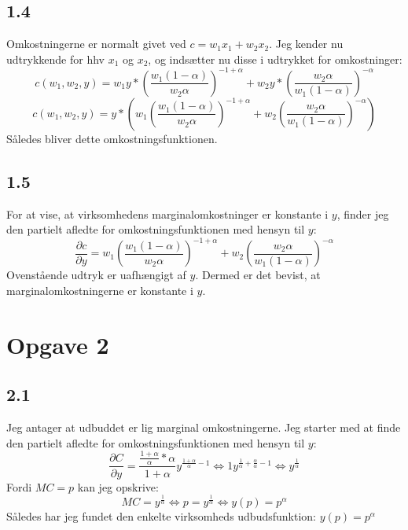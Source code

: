 \documentclass{article}
\begin{document}
\subsection*{1.4}
Omkostningerne er normalt givet ved $c=w_1 x_1+w_2 x_2$. Jeg kender nu udtrykkende for hhv $x_1$ og $x_2$, og indsætter nu disse i udtrykket for omkostninger:
\begin{equation}
    c\left(w_1, w_2, y\right)=w_1 y *\left(\frac{w_1(1-\alpha)}{w_2 \alpha}\right)^{-1+\alpha}+w_2 y *\left(\frac{w_2 \alpha}{w_1(1-\alpha)}\right)^{-\alpha}
\end{equation}
\begin{equation}
    c\left(w_1, w_2, y\right)=y*(w_1 \left(\frac{w_1(1-\alpha)}{w_2 \alpha}\right)^{-1+\alpha}+w_2 \left(\frac{w_2 \alpha}{w_1(1-\alpha)}\right)^{-\alpha})
\end{equation}
Således bliver dette omkostningsfunktionen.

\subsection*{1.5}
For at vise, at virksomhedens marginalomkostninger er konstante i $y$, finder jeg den partielt afledte for omkostningsfunktionen med hensyn til $y$:
\begin{equation}
    \frac{\partial c}{\partial y}=w_1 \left(\frac{w_1(1-\alpha)}{w_2 \alpha}\right)^{-1+\alpha}+w_2 \left(\frac{w_2 \alpha}{w_1(1-\alpha)}\right)^{-\alpha}
\end{equation}
Ovenstående udtryk er uafhængigt af $y$. Dermed er det bevist, at marginalomkostningerne er konstante i $y$.



\section*{Opgave 2}
\subsection*{2.1}
Jeg antager at udbuddet er lig marginal omkostningerne. Jeg starter med at finde den partielt afledte for omkostningsfunktionen med hensyn til $y$:
\begin{equation}
    \frac{\partial C}{\partial y}=\frac{\frac{1+\alpha}{\alpha} * \alpha}{1+\alpha} y^{\frac{1+\alpha}{\alpha}-1} \Leftrightarrow 1 y^{\frac{1}{\alpha}+\frac{\alpha}{\alpha}-1} \Leftrightarrow y^{\frac{1}{\alpha}}
\end{equation}
Fordi $MC=p$ kan jeg opskrive:
\begin{equation}
    MC=y^\frac{1}{\alpha} \Leftrightarrow p=y^\frac{1}{\alpha} \Leftrightarrow y(p)=p^{\alpha}
\end{equation}
Således har jeg fundet den enkelte virksomheds udbudsfunktion:
$y(p)=p^{\alpha}$
\end{document}
